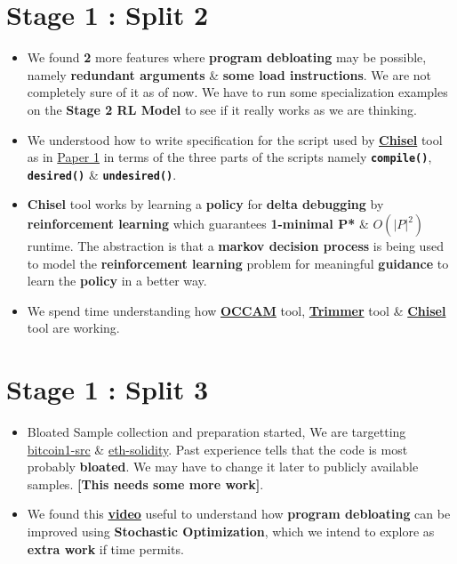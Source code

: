 \documentclass{article} %
\begin{document}
\section*{\color{darkmidnightblue} Stage 1 : Split 2}
\begin{itemize}
	\item We found \textbf{2} more features where \textbf{program debloating} may be possible, namely \textbf{\color{ao(english)} redundant arguments} \& \textbf{\color{ao(english)} some load instructions}. We are not completely sure of it as of now. We have to run some specialization examples on the \textbf{Stage 2 RL Model} to see if it really works as we are thinking.
	\item We understood how to write specification for the script used by \textbf{\href{https://github.com/aspire-project/chisel}{Chisel}} tool as in \href{https://dl.acm.org/doi/10.1145/3243734.3243838}{Paper 1} in terms of the three parts of the scripts namely \textbf{\texttt{compile()}}, \textbf{\texttt{desired()}} \& \texttt{\textbf{undesired()}}.
	\item \textbf{Chisel} tool works by learning a \textbf{policy} for \textbf{delta debugging} by \textbf{reinforcement learning} which guarantees \textbf{1-minimal P*} \& $\textbf{$O(|P|^2)$}$ runtime. The abstraction is that a \textbf{markov decision process} is being used to model the \textbf{reinforcement learning} problem for meaningful \textbf{guidance} to learn the \textbf{policy} in a better way.
	\item We spend time understanding how \textbf{\href{https://github.com/ashish-gehani/OCCAM}{OCCAM}} tool, \textbf{\href{http://www.csl.sri.com/users/gehani/papers/ASE-2018.Trimmer.pdf}{Trimmer}} tool \& \textbf{\href{https://github.com/aspire-project/chisel}{Chisel}} tool are working.
\end{itemize}

\section*{\color{darkmidnightblue} Stage 1 : Split 3}
\begin{itemize}
	\item Bloated Sample collection and preparation started, We are targetting \href{https://github.com/bitcoin/bitcoin}{bitcoin1-src} \& \href{https://github.com/ethereum/solidity}{eth-solidity}. Past experience tells that the code is most probably \textbf{bloated}. We may have to change it later to publicly available samples. \textbf{\color{red}[This needs some more work]}.
	\item We found this \textbf{\href{https://www.youtube.com/watch?v=hC4zIwyv1bg}{video}} useful to understand how \textbf{program debloating} can be improved using \textbf{Stochastic Optimization}, which we intend to explore as \textbf{extra work} if time permits.
\end{itemize}
\end{document}
